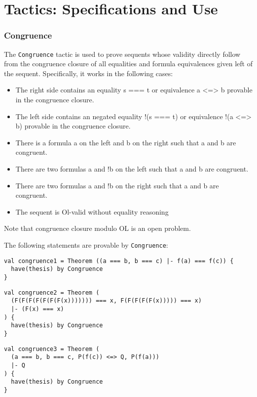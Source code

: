 \chapter{Tactics: Specifications and Use}
\label{chapt:tactics}

\subsection*{Congruence}
The \lstinline|Congruence| tactic is used to prove sequents whose validity directly follow from the congruence closure of all equalities and formula equivalences given left of the sequent.
Specifically, it works in the following cases:
\begin{itemize}
  \item The right side contains an equality s === t or equivalence a <=> b provable in the congruence closure.
  \item The left side contains an negated equality !(s === t) or equivalence !(a <=> b) provable in the congruence closure.
  \item There is a formula a on the left and b on the right such that a and b are congruent.
  \item There are two formulas a and !b on the left such that a and b are congruent.
  \item There are two formulas a and !b on the right such that a and b are congruent.
  \item The sequent is Ol-valid without equality reasoning
\end{itemize}
Note that congruence closure modulo OL is an open problem.

\begin{example}
  The following statements are provable by \lstinline|Congruence|:
\newline\begin{lstlisting}[language=lisa, frame=single]
val congruence1 = Theorem ((a === b, b === c) |- f(a) === f(c)) {
  have(thesis) by Congruence
}
\end{lstlisting}

\begin{lstlisting}[language=lisa, frame=single]
val congruence2 = Theorem (
  (F(F(F(F(F(F(F(x))))))) === x, F(F(F(F(F(x))))) === x) 
  |- (F(x) === x)
) {
  have(thesis) by Congruence
}
\end{lstlisting}

\begin{lstlisting}[language=lisa, frame=single]
val congruence3 = Theorem (
  (a === b, b === c, P(f(c)) <=> Q, P(f(a))) 
  |- Q
) {
  have(thesis) by Congruence
}
\end{lstlisting}
  
\end{example}

